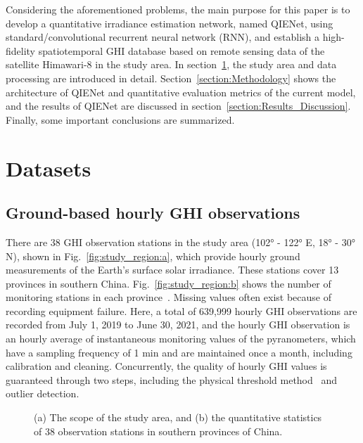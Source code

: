 \documentclass[review]{elsarticle}
\begin{document}
Considering the aforementioned problems, the main purpose for this paper is to develop a quantitative irradiance estimation network, named QIENet, using standard/convolutional recurrent neural network (RNN), and establish a high-fidelity spatiotemporal GHI database based on remote sensing data of the satellite Himawari-8 in the study area. In section~\ref{section:Datasets}, the study area and data processing are introduced in detail. Section~\ref{section:Methodology} shows the architecture of QIENet and quantitative evaluation metrics of the current model, and the results of QIENet are discussed in section~\ref{section:Results_Discussion}. Finally, some important conclusions are summarized.

\section{Datasets}
\label{section:Datasets}
\subsection{Ground-based hourly GHI observations} %
\label{datasets:Irradiance}
There are 38 GHI observation stations in the study area (102° - 122° E, 18° - 30° N), shown in Fig.~\ref{fig:study_region:a}, which provide hourly ground measurements of the Earth's surface solar irradiance.
These stations cover 13 provinces in southern China.
Fig.~\ref{fig:study_region:b} shows the number of monitoring stations in each province~\citep{FAN2019168, Zhang202010}.
Missing values often exist because of recording equipment failure.
Here, a total of 639,999 hourly GHI observations are recorded from July 1, 2019 to June 30, 2021,
and the hourly GHI observation is an hourly average of instantaneous monitoring values of the pyranometers, which have a sampling frequency of 1 min and are maintained once a month, including calibration and cleaning.
Concurrently, the quality of hourly GHI values is guaranteed through two steps, including the physical threshold method~\citep{MORADI20091, TANG2010466} and outlier detection.

\begin{figure}[H]
    \centering
    \vspace{0mm}
    \hfill
    \caption{(a) The scope of the study area, and (b) the quantitative statistics of 38 observation stations in southern provinces of China.}
    \label{fig:study_region}
\end{figure}
\end{document}
